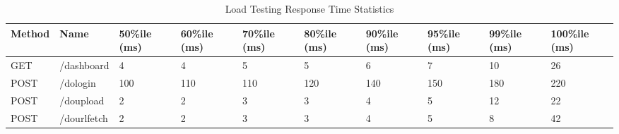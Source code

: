 \begin{table*}[]
  \caption{Load Testing Response Time Statistics}
  \label{tab:loadrespstat}
  \begin{tabular}{|p{}|p{}|p{}|p{}|p{}|p{}|p{}|p{}|p{}|p{}|}
    \hline
{\textbf{Method}} & {\textbf{Name}} & {\textbf{50\%ile (ms)}} & {\textbf{60\%ile (ms)}} & {\textbf{70\%ile (ms)}} & {\textbf{80\%ile (ms)}} & {\textbf{90\%ile (ms)}} & {\textbf{95\%ile (ms)}} & {\textbf{99\%ile (ms)}} & {\textbf{100\%ile (ms)}} \\ \hline
GET                                   & /dashboard                         & 4                                          & 4                                          & 5                                          & 5                                          & 6                                          & 7                                          & 10                                         & 26                                          \\ \hline
{\color[HTML]{2A2B2E} POST}           & /dologin                           & 100                                        & 110                                        & 110                                        & 120                                        & 140                                        & 150                                        & 180                                        & 220                                         \\ \hline
{\color[HTML]{2A2B2E} POST}           & /doupload                          & 2                                          & 2                                          & 3                                          & 3                                          & 4                                          & 5                                          & 12                                         & 22                                          \\ \hline
POST                                  & /dourlfetch                        & 2                                          & 2                                          & 3                                          & 3                                          & 4                                          & 5                                          & 8                                          & 42                                          \\ \hline

\end{tabular}
\end{table*}
